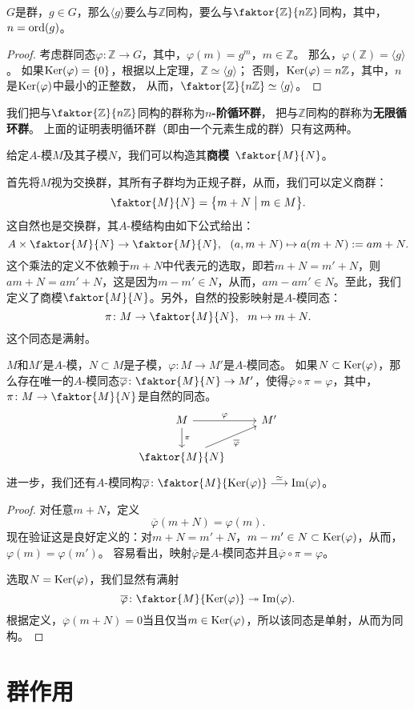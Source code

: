 \documentclass[lang=cn,10pt]{elegantbook}
\begin{document}
	\begin{corollary}[循环群的结构]
		$G$是群，$g\in G$，那么$\langle g \rangle$要么与\(\mathbb{Z}\)同构，要么与$\faktor{\mathbb{Z}}{n\mathbb{Z}}$同构，其中，$n={\rm ord}(g)$。
	\end{corollary}
	\begin{proof}
		考虑群同态$\varphi\colon \mathbb{Z}\rightarrow G$，其中，$\varphi(m)=g^m$，$m\in \mathbb{Z}$。
		那么，$\varphi(\mathbb{Z})=\langle g\rangle$。
		如果${\rm Ker}(\varphi)=\{0\}$，根据以上定理，$\mathbb{Z}\simeq \langle g\rangle$；
		否则，${\rm Ker}(\varphi)=n\mathbb{Z}$，其中，$n$是${\rm Ker}(\varphi)$中最小的正整数，
		从而，$\faktor{\mathbb{Z}}{n\mathbb{Z}}\simeq \langle g \rangle$。
	\end{proof}
	我们把与$\faktor{\mathbb{Z}}{n\mathbb{Z}}$同构的群称为{\bf $n$-阶循环群}，
	把与$\mathbb{Z}$同构的群称为{\bf 无限循环群}。
	上面的证明表明循环群（即由一个元素生成的群）只有这两种。
	
	\begin{definition}[商模]
		给定$A$-模$M$及其子模$N$，我们可以构造其{\bf 商模}~$\faktor{M}{N}$。
		
		首先将$M$视为交换群，其所有子群均为正规子群，从而，我们可以定义商群：
		\[\faktor{M}{N}=\big\{m+N\bigm|m\in M\big\}.\]
		这自然也是交换群，其$A$-模结构由如下公式给出：
		\[A\times \faktor{M}{N}\rightarrow \faktor{M}{N}, \ \ (a,m+N)\mapsto a(m+N):= am+N.\]
		这个乘法的定义不依赖于$m+N$中代表元的选取，即若$m+N=m'+N$，则$am+N=am'+N$，这是因为$m-m'\in N$，从而，$am-am'\in N$。至此，我们定义了商模$\faktor{M}{N}$。另外，自然的投影映射是$A$-模同态：
		\[\pi\colon M\rightarrow \faktor{M}{N}, \ \ m\mapsto m+N.\]
		这个同态是满射。
	\end{definition}
	\begin{theorem}[线性代数基本定理]
		$M$和$M'$是$A$-模，$N\subset M$是子模，$\varphi\colon M \rightarrow M'$是$A$-模同态。
		如果$N\subset{\rm Ker}(\varphi)$，那么存在唯一的$A$-模同态$\overline{\varphi}\colon\faktor{M}{N} \rightarrow M'$，使得$\overline{\varphi}\circ\pi=\varphi$，其中，$\pi\colon M\rightarrow \faktor{M}{N}$是自然的同态。
		\[\begin{tikzcd}
			M \arrow[r, "\varphi"] \arrow[d, "\pi"] &  M'\\
			\faktor{M}{N}  \arrow[ur, "\overline{\varphi}",swap] &      \end{tikzcd}
		\]
		进一步，我们还有$A$-模同构$\overline{\varphi}\colon\faktor{M}{{\rm Ker}(\varphi)} \stackrel{\simeq}{\longrightarrow} {\rm Im}(\varphi)$。
	\end{theorem}
	\begin{proof}
		对任意$m+N$，定义\[\overline{\varphi}(m+N)=\varphi(m).\]
		现在验证这是良好定义的：对$m+N=m'+N$，$m-m'\in N\subset {\rm Ker}(\varphi)$，从而，$\varphi(m)=\varphi(m')$。
		容易看出，映射$\overline{\varphi}$是$A$-模同态并且$\overline{\varphi}\circ\pi=\varphi$。
		
		选取$N={\rm Ker}(\varphi)$，我们显然有满射
		\[\overline{\varphi}\colon \faktor{M}{{\rm Ker}(\varphi)} \twoheadrightarrow  {\rm Im}(\varphi).\]
		根据定义，$\overline{\varphi}(m+N)=0$当且仅当$m\in {\rm Ker}(\varphi)$，所以该同态是单射，从而为同构。
	\end{proof}
	
	\chapter{群作用}
\end{document}
